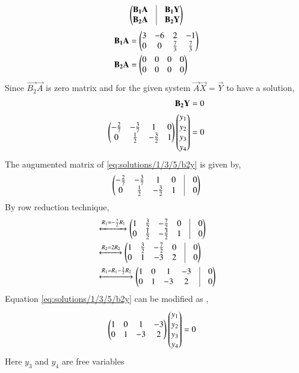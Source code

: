 \begin{align}
    \myvec{\vec{B_1}\vec{A} & \vrule & \vec{B_1}\vec{Y}\\
    \vec{B_2}\vec{A} & \vrule & \vec{B_2}\vec{Y}}
\end{align}
\begin{align}
    \mathbf{B_1}\mathbf{A}&=\begin{pmatrix}3 & -6 & 2 & -1\\0 & 0 & \frac{7}{3} & \frac{7}{3}\end{pmatrix}\\
    \mathbf{B_2}\mathbf{A}&=\begin{pmatrix}0 & 0 & 0 & 0\\ 0 & 0 & 0 & 0\end{pmatrix}
\end{align}
Since $\vec{B_2}\vec{A}$ is zero matrix and for the given system $\vec{A}\vec{X}=\vec{Y}$ to have a solution,
\begin{align}
\mathbf{B_2}\mathbf{Y}&=0\label{eq:solutions/1/3/5/b1}\\
\begin{pmatrix}-\frac{2}{7} & -\frac{3}{7} & 1 & 0 \\ 0 & \frac{1}{2} & -\frac{3}{2} & 1\end{pmatrix}\begin{pmatrix}y_1\\y_2\\y_3\\y_4\end{pmatrix}&=0\label{eq:solutions/1/3/5/b2y}
\end{align}
The augumented matrix of \eqref{eq:solutions/1/3/5/b2y} is given by,
\begin{align}
    \myvec{-\frac{2}{7} & -\frac{3}{7} & 1 & 0 &\vrule & 0 \\ 0 & \frac{1}{2} & -\frac{3}{2} & 1 & \vrule & 0}
\end{align}
By row reduction technique,
\begin{align}
        &\xleftrightarrow{R_1=-\frac{7}{2}R_1}\myvec{1 & \frac{3}{2} &-\frac{7}{2}  & 0 &\vrule & 0 \\ 0 & \frac{1}{2} & -\frac{3}{2} & 1 & \vrule & 0}\\
        &\xleftrightarrow{R_2=2R_2}\myvec{1 & \frac{3}{2} &-\frac{7}{2}  & 0 &\vrule & 0 \\ 0 & 1 & -3 & 2 & \vrule & 0}\\
        &\xleftrightarrow{R_1=R_1-\frac{3}{2}R_2}\myvec{1 & 0 &1  & -3 &\vrule & 0 \\ 0 & 1 & -3 & 2 & \vrule & 0}
\end{align}
Equation \eqref{eq:solutions/1/3/5/b2y} can be modified as , 
\begin{align}
    \begin{pmatrix}1 & 0 & 1 & -3 \\ 0 & 1 & -3 & 2\end{pmatrix}\begin{pmatrix}y_1\\y_2\\y_3\\y_4\end{pmatrix}&=0
\end{align}
Here $y_3$ and $y_4$ are free variables

